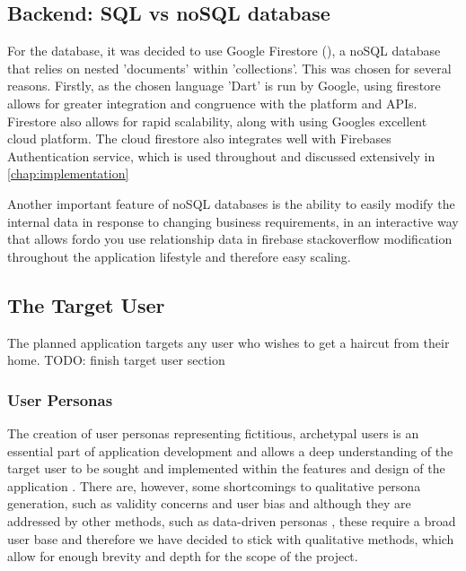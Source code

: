 \documentclass[12pt]{article}
\begin{document}
	\subsection{Backend: SQL vs noSQL database}
	For the database, it was decided to use Google Firestore (\cite{CloudFirestoreFirebase}), a noSQL database that relies on  nested 'documents' within 'collections'. This was chosen for several reasons. Firstly, as the chosen language 'Dart' is run by Google, using firestore allows for greater integration and congruence with the platform and APIs. Firestore also allows for rapid scalability, along with using Googles excellent cloud platform. The cloud firestore also integrates well with Firebases Authentication service, which is used throughout and discussed extensively in \autoref{chap:implementation}
	
	Another important feature of noSQL databases is the ability to easily modify the internal data in response to changing business requirements, in an interactive way that allows fordo you use relationship data in firebase stackoverflow modification throughout the application lifestyle and therefore easy scaling.
	
	

	
	
	\subsection{The Target User}
	\label{chap:target-user}
	The planned application targets any user who wishes to get a haircut from their home.
	TODO: finish target user section 

	
	
	\subsubsection{User Personas}
	\label{user-personas}
	The creation of user personas representing fictitious, archetypal users is an essential part of application development \cite{PDFPersonasParticipatory} and allows a deep understanding of the target user to be sought and implemented within the features and design of the application \cite{arnowitzChapter15Wireframe2007}. There are, however, some shortcomings to qualitative persona generation, such as validity concerns and user bias \cite{chapmanPersonasNewClothes2005} and although they are addressed by other methods, such as data-driven personas \cite{mcginnDatadrivenPersonaDevelopment2008}, these require a broad user base and therefore we have decided to stick with qualitative methods, which allow for enough brevity and depth for the scope of the project.
	
\end{document}
